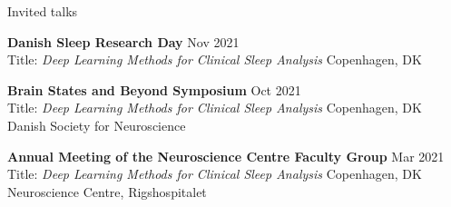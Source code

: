 \documentclass{resume} %
\begin{document}
\begin{rSection}{Invited talks}

    {\bf Danish Sleep Research Day} \hfill {Nov 2021} \\
	Title: \textit{Deep Learning Methods for Clinical Sleep Analysis} \hfill {Copenhagen, DK}

    {\bf Brain States and Beyond Symposium} \hfill {Oct 2021} \\
	Title: \textit{Deep Learning Methods for Clinical Sleep Analysis} \hfill {Copenhagen, DK} \\
	Danish Society for Neuroscience

    {\bf Annual Meeting of the Neuroscience Centre Faculty Group} \hfill {Mar 2021} \\
	Title: \textit{Deep Learning Methods for Clinical Sleep Analysis} \hfill {Copenhagen, DK} \\
	Neuroscience Centre, Rigshospitalet

\end{rSection}










\end{document}
